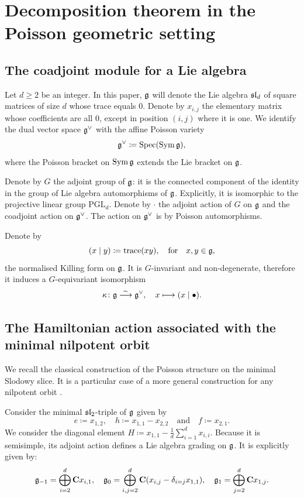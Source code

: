 \section{Decomposition theorem in the Poisson geometric setting}

\label{section:geometric-setting}

\subsection{The coadjoint module for a Lie algebra}

Let $d \geqslant 2$ be an integer. In this paper, $\g$ will denote the Lie algebra $\sl_d$ of square matrices of size $d$ whose trace equals $0$. Denote by $x_{i,j}$ the elementary matrix whose coefficients are all $0$, except in position $(i,j)$ where it is one. We identify the dual vector space $\g^\vee$ with the affine Poisson variety
\[ \g^\vee \coloneqq \Spec (\Sym \g), \]
where the Poisson bracket on $\Sym \g$ extends the Lie bracket on $\g$.

Denote by $G$ the adjoint group of $\g$: it is the connected component of the identity in the group of Lie algebra automorphisms of $\g$. Explicitly, it is isomorphic to the projective linear group $\mathrm{PGL}_d$. Denote by $\cdot$ the adjoint action of $G$ on $\g$ and the coadjoint action on $\g^\vee$. The action on $\g^\vee$ is by Poisson automorphisms.


Denote by 
\[ (x \mid y) \coloneq \operatorname{trace}(xy), \quad \text{for} \quad x, y \in \g,  \]
the normalised Killing form on $\g$. It is $G$-invariant and non-degenerate, therefore it induces a $G$-equivariant isomorphism
\[ \kappa \colon \g \overset{\sim}{\longrightarrow} \g^\vee, \quad x \longmapsto (x \mid \bullet). \]

\subsection{The Hamiltonian action associated with the minimal nilpotent orbit}

We recall the classical construction of the Poisson structure on the minimal Slodowy slice. It is a particular case of a more general construction for any nilpotent orbit \cite{kostant1978whittaker,lynch1979generalized,premet2002special,gan2002quantization,losev2010quantized}. 

Consider the minimal $\sl_2$-triple of $\g$ given by
\[ e \coloneqq x_{1,2}, \quad h \coloneqq x_{1,1} - x_{2,2} \quad \text{and} \quad f \coloneq x_{2,1}. \]
We consider the diagonal element $H \coloneqq x_{1,1} - \frac{1}{d} \sum_{i=1}^{d} x_{i,i}$. Because it is semisimple, its adjoint action defines a Lie algebra grading on $\g$. It is explicitly given by:
\[ \g_{-1} = \bigoplus_{i=2}^d \C x_{i,1}, \quad \g_0 = \bigoplus_{i,j=2}^d \C (x_{i,j} - \delta_{i=j}x_{1,1}), \quad \g_{1}  = \bigoplus_{j=2}^d \C x_{1,j}. \]

